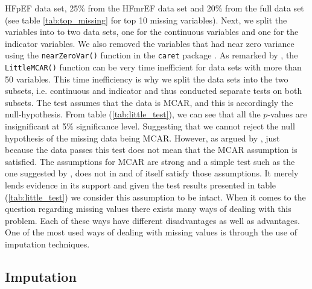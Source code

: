 \documentclass[../thesis.tex]{subfiles}
\begin{document}
 

\noindent HFpEF data set, 25\% from the HFmrEF data set and 20\% from the full data set (see table \ref{tab:top_missing} for top 10 missing variables). Next, we split the variables into to two data sets, one for the continuous variables and one for the indicator variables. We also removed the variables that had near zero variance using the \texttt{nearZeroVar()} function in the \texttt{caret} package \citep{kuhncaret}. As remarked by \cite{BaylorEdPsych}, the \texttt{LittleMCAR()} function can be very time inefficient for data sets with more than 50 variables. This time inefficiency is why we split the data sets into the two subsets, i.e. continuous and indicator and thus conducted separate tests on both subsets. The test assumes that the data is MCAR, and this is accordingly the null-hypothesis. From table (\ref{tab:little_test}), we can see that all the $p$-values are insignificant at 5\% significance level. Suggesting that we cannot reject the null hypothesis of the missing data  
\noindent being MCAR. However, as argued by \cite{allison1999missing}, just because the data passes this test does not mean that the MCAR assumption is satisfied. The assumptions for MCAR are strong and a simple test such as the one suggested by \cite{little1988test}, does not in and of itself satisfy those assumptions. It merely lends evidence in its support and given the test results presented in table (\ref{tab:little_test}) we consider this assumption to be intact. When it comes to the question regarding missing values there exists many ways of dealing with this problem. Each of these ways have different disadvantages as well as advantages. One of the most used ways of dealing with missing values is through the use of imputation techniques. 

\subsection{Imputation}
\label{subsec:impu}
\end{document}
